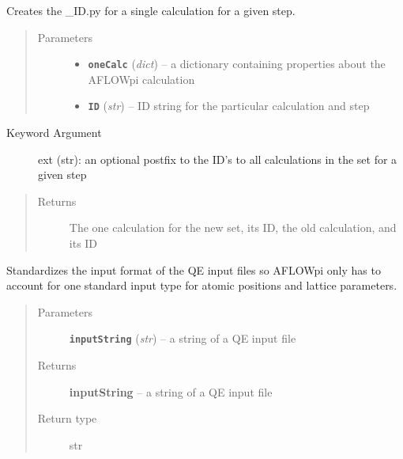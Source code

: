\documentclass[letterpaper,10pt,english]{sphinxmanual}
\begin{document}
\begin{fulllineitems}
\label{prep:prep.__temp_executable}
Creates the \_ID.py for a single calculation for a given step.
\begin{quote}\begin{description}
\item[{Parameters}] \leavevmode\begin{itemize}
\item {} 
\textbf{\texttt{oneCalc}} (\emph{dict}) -- a dictionary containing properties about the AFLOWpi calculation

\item {} 
\textbf{\texttt{ID}} (\emph{str}) -- ID string for the particular calculation and step

\end{itemize}

\end{description}\end{quote}
\begin{description}
\item[{Keyword Argument}] \leavevmode
ext (str): an optional postfix to the ID's to all calculations in the set for a given step

\end{description}
\begin{quote}\begin{description}
\item[{Returns}] \leavevmode
The one calculation for the new set, its ID, the old calculation, and its ID

\end{description}\end{quote}

\end{fulllineitems}


\begin{fulllineitems}
\label{prep:prep.__transformInput}
Standardizes the input format of the QE input files so AFLOWpi only has to account
for one standard input type for atomic positions and lattice parameters.
\begin{quote}\begin{description}
\item[{Parameters}] \leavevmode
\textbf{\texttt{inputString}} (\emph{str}) -- a string of a QE input file

\item[{Returns}] \leavevmode
\textbf{inputString} --
a string of a QE input file

\item[{Return type}] \leavevmode
str

\end{description}\end{quote}

\end{fulllineitems}
\end{document}
